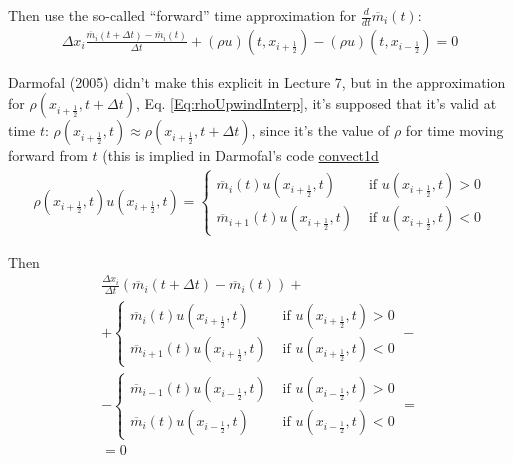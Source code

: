 \documentclass[10pt]{amsart}
\begin{document}
\begin{multicols*}{2}
Then use the so-called ``forward'' time approximation for $\frac{d}{dt} \overline{m}_i(t)$:
\[
\begin{gathered}
\Delta x_i \frac{ \overline{m}_i(t+\Delta t) - \overline{m}_i(t) }{ \Delta t} + (\rho u)(t,x_{i+\frac{1}{2} } ) - (\rho u)(t,x_{i-\frac{1}{2} } ) = 0
  \end{gathered}
\]

Darmofal (2005) \cite{Darm2005} didn't make this explicit in Lecture 7, but in the approximation for  $\rho(x_{i+\frac{1}{2} },t+\Delta t)$, Eq. \ref{Eq:rhoUpwindInterp}, it's supposed that it's valid at time $t$: $\rho(x_{i+\frac{1}{2} },t) \approx  \rho(x_{i+\frac{1}{2} },t+\Delta t)$, since it's the value of $\rho$ for time moving forward from $t$ (this is implied in Darmofal's code \href{http://ocw.mit.edu/courses/aeronautics-and-astronautics/16-901-computational-methods-in-aerospace-engineering-spring-2005/lecture-notes/convect1d.m}{convect1d}
\[
\begin{gathered}
  \rho(x_{i+\frac{1}{2} },t)u(x_{i+\frac{1}{2} },t) = \begin{cases} \overline{m}_i(t)u(x_{i+\frac{1}{2} },t) & \text{ if } u(x_{i+\frac{1}{2}},t )>0 \\
    \overline{m}_{i+1}(t)u(x_{i+\frac{1}{2} },t) & \text{ if } u(x_{i+\frac{1}{2}},t )<0
    \end{cases}
  \end{gathered}
\]

Then
\begin{equation}
\begin{gathered}
\frac{ \Delta x_i }{ \Delta t}( \overline{m}_i(t+\Delta t) - \overline{m}_i(t) ) + \\
+ \begin{cases} \overline{m}_i(t)u(x_{i+\frac{1}{2} },t) & \text{ if } u(x_{i+\frac{1}{2}},t )>0 \\
    \overline{m}_{i+1}(t)u(x_{i+\frac{1}{2} },t) & \text{ if } u(x_{i+\frac{1}{2}},t )<0
\end{cases} - \\
- \begin{cases} \overline{m}_{i-1}(t)u(x_{i-\frac{1}{2} },t) & \text{ if } u(x_{i-\frac{1}{2}},t )>0 \\
    \overline{m}_{i}(t)u(x_{i-\frac{1}{2} },t) & \text{ if } u(x_{i-\frac{1}{2}},t )<0
\end{cases} = \\
= 0
  \end{gathered}
  \end{equation}


\end{multicols*}
\end{document}
